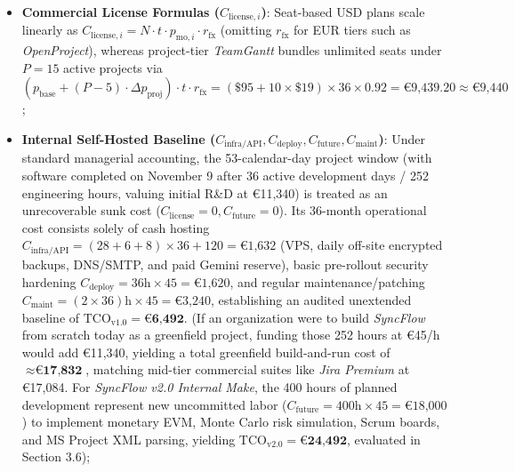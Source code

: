\begin{itemize}[itemsep=1pt,topsep=1pt]
    \item \textbf{Commercial License Formulas ($C_{\text{license},i}$)}: Seat-based USD plans scale linearly as $C_{\text{license},i} = N \cdot t \cdot p_{\text{mo},i} \cdot r_{\text{fx}}$ (omitting $r_{\text{fx}}$ for EUR tiers such as \textit{OpenProject}), whereas project-tier \textit{TeamGantt} bundles unlimited seats under $P = 15$ active projects via $(p_{\text{base}} + (P - 5) \cdot \Delta p_{\text{proj}}) \cdot t \cdot r_{\text{fx}} = (\$95 + 10 \times \$19) \times 36 \times 0.92 = \text{€9,439.20} \approx \text{€9,440}$;
    
    \vspace{1mm}
    
    \item \textbf{Internal Self-Hosted Baseline ($C_{\text{infra/API}}, C_{\text{deploy}}, C_{\text{future}}, C_{\text{maint}}$)}: Under standard managerial accounting, the 53-calendar-day project window (with software completed on November 9 after 36 active development days / 252 engineering hours, valuing initial R\&D at €11,340) is treated as an unrecoverable sunk cost ($C_{\text{license}} = 0, C_{\text{future}} = 0$). Its 36-month operational cost consists solely of cash hosting $C_{\text{infra/API}} = (28 + 6 + 8) \times 36 + 120 = \text{€1,632}$ (VPS, daily off-site encrypted backups, DNS/SMTP, and paid Gemini reserve), basic pre-rollout security hardening $C_{\text{deploy}} = 36\text{h} \times 45 = \text{€1,620}$, and regular maintenance/patching $C_{\text{maint}} = (2 \times 36)\text{h} \times 45 = \text{€3,240}$, establishing an audited unextended baseline of $\text{TCO}_{\text{v1.0}} = \textbf{€6,492}$. (If an organization were to build \textit{SyncFlow} from scratch today as a greenfield project, funding those 252 hours at €45/h would add €11,340, yielding a total greenfield build-and-run cost of $\approx \textbf{€17,832}$, matching mid-tier commercial suites like \textit{Jira Premium} at €17,084. For \textit{SyncFlow v2.0 Internal Make}, the 400 hours of planned development represent new uncommitted labor ($C_{\text{future}} = 400\text{h} \times 45 = \text{€18,000}$) to implement monetary EVM, Monte Carlo risk simulation, Scrum boards, and MS Project XML parsing, yielding $\text{TCO}_{\text{v2.0}} = \textbf{€24,492}$, evaluated in Section 3.6);
    
    \vspace{1mm}
    

\end{itemize}
